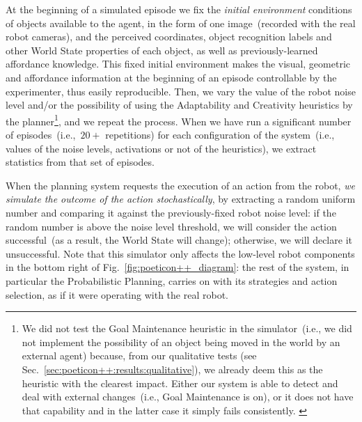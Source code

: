 At the beginning of a simulated episode we fix the \emph{initial environment} conditions of objects available to the agent, in the form of one image~(recorded with the real robot cameras), and the perceived coordinates, object recognition labels and other World State properties of each object,
as well as previously-learned affordance knowledge.
This fixed initial environment makes the visual, geometric and affordance information at the beginning of an episode controllable by the experimenter, thus easily reproducible.
Then, we vary the value of the robot noise level and/or the possibility of using the Adaptability
and Creativity
heuristics by the planner\footnote{%
We did not test the Goal Maintenance heuristic in the simulator~(i.e., we did not implement the possibility of an object being moved in the world by an external agent) because, from our qualitative tests (see Sec.~\ref{sec:poeticon++:results:qualitative}), we already deem this as the heuristic with the clearest impact. Either our system is able to detect and deal with external changes~(i.e., Goal Maintenance is on), or it does not have that capability and in the latter case it simply fails consistently. \label{footnote_goalmaint}}, %
and we repeat the process.
When we have run a significant number of episodes~(i.e.,~$20+$ repetitions) for each configuration of the system~(i.e., values of the noise levels, activations or not of the heuristics), we extract statistics from that set of episodes.

When the planning system requests the execution of an action from the robot, \emph{we simulate the outcome of the action stochastically}, by extracting a random uniform number and comparing it against the previously-fixed robot noise level: if the random number is above the noise level threshold, we will consider the action successful~(as a result, the World State will change); otherwise, we will declare it unsuccessful.
Note that this simulator only affects the low-level robot components in the bottom right of Fig.~\ref{fig:poeticon++_diagram}: the rest of the system, in particular the Probabilistic Planning, carries on with its strategies and action selection, as if it were operating with the real robot.

